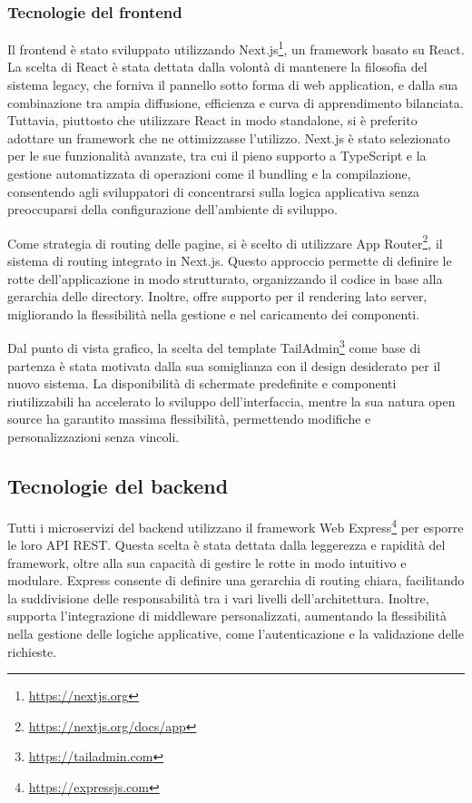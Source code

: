 \subsubsection{Tecnologie del frontend}
Il frontend è stato sviluppato utilizzando Next.js\footnote{\url{https://nextjs.org}}, un framework basato su React. La scelta di React è stata dettata dalla volontà di mantenere la filosofia del sistema legacy, che forniva il pannello sotto forma di web application, e dalla sua combinazione tra ampia diffusione, efficienza e curva di apprendimento bilanciata. Tuttavia, piuttosto che utilizzare React in modo standalone, si è preferito adottare un framework che ne ottimizzasse l’utilizzo. Next.js è stato selezionato per le sue funzionalità avanzate, tra cui il pieno supporto a TypeScript e la gestione automatizzata di operazioni come il bundling e la compilazione, consentendo agli sviluppatori di concentrarsi sulla logica applicativa senza preoccuparsi della configurazione dell'ambiente di sviluppo.

Come strategia di routing delle pagine, si è scelto di utilizzare App Router\footnote{\url{https://nextjs.org/docs/app}}, il sistema di routing integrato in Next.js. Questo approccio permette di definire le rotte dell'applicazione in modo strutturato, organizzando il codice in base alla gerarchia delle directory. Inoltre, offre supporto per il rendering lato server, migliorando la flessibilità nella gestione e nel caricamento dei componenti.

Dal punto di vista grafico, la scelta del template TailAdmin\footnote{\url{https://tailadmin.com}} come base di partenza è stata motivata dalla sua somiglianza con il design desiderato per il nuovo sistema. La disponibilità di schermate predefinite e componenti riutilizzabili ha accelerato lo sviluppo dell’interfaccia, mentre la sua natura open source ha garantito massima flessibilità, permettendo modifiche e personalizzazioni senza vincoli.

\subsection{Tecnologie del backend}
Tutti i microservizi del backend utilizzano il framework Web Express\footnote{\url{https://expressjs.com}} per esporre le loro API REST. Questa scelta è stata dettata dalla leggerezza e rapidità del framework, oltre alla sua capacità di gestire le rotte in modo intuitivo e modulare. Express consente di definire una gerarchia di routing chiara, facilitando la suddivisione delle responsabilità tra i vari livelli dell'architettura. Inoltre, supporta l'integrazione di middleware personalizzati, aumentando la flessibilità nella gestione delle logiche applicative, come l'autenticazione e la validazione delle richieste.

